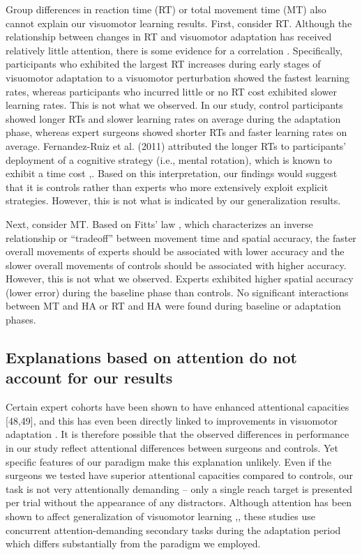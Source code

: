 \documentclass[man, 11pt, longtable, floatsintext, notab]{apa6}
\begin{document}
Group differences in reaction time (RT) or total movement
time (MT) also cannot explain our visuomotor learning
results. First, consider RT. Although the relationship
between changes in RT and visuomotor adaptation has received
relatively little attention, there is some evidence for a
correlation \cite{anguera_contributions_2010}. Specifically,
participants who exhibited the largest RT increases during
early stages of visuomotor adaptation to a visuomotor
perturbation showed the fastest learning rates, whereas
participants who incurred little or no RT cost exhibited
slower learning rates. This is not what we observed. In our
study, control participants showed longer RTs and slower
learning rates on average during the adaptation phase,
whereas expert surgeons showed shorter RTs and faster
learning rates on average. Fernandez-Ruiz et al. (2011)
\cite{fernandez-ruiz_relation_2011} attributed the longer
RTs to participants’ deployment of a cognitive strategy
(i.e., mental rotation), which is known to exhibit a time
cost
\cite{mackenzie_movement_1995},\cite{green_action_2003}.
Based on this interpretation, our findings would suggest
that it is controls rather than experts who more extensively
exploit explicit strategies. However, this is not what is
indicated by our generalization results.

Next, consider MT. Based on Fitts’ law
\cite{bavelier_enhancing_2019}, which characterizes an
inverse relationship or “tradeoff” between movement time and
spatial accuracy, the faster overall movements of experts
should be associated with lower accuracy and the slower
overall movements of controls should be associated with
higher accuracy. However, this is not what we observed.
Experts exhibited higher spatial accuracy (lower error)
during the baseline phase than controls. No significant
interactions between MT and HA or RT and HA were found
during baseline or adaptation phases.

\subsection{Explanations based on attention do not account 
for our results}
Certain expert cohorts have been shown to have enhanced
attentional capacities [48,49], and this has even been
directly linked to improvements in visuomotor adaptation
\cite{debats_explicit_2018}. It is therefore possible that
the observed differences in performance in our study reflect
attentional differences between surgeons and controls. Yet
specific features of our paradigm make this explanation
unlikely. Even if the surgeons we tested have superior
attentional capacities compared to controls, our task is not
very attentionally demanding – only a single reach target is
presented per trial without the appearance of any
distractors. Although attention has been shown to affect
generalization of visuomotor learning
\cite{bedard_attention_2013},\cite{wang_impaired_2017},
these studies use concurrent attention-demanding secondary
tasks during the adaptation period which differs
substantially from the paradigm we employed.
\end{document}
